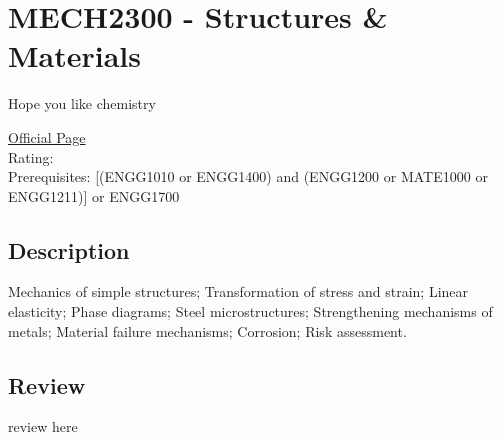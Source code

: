 \hypertarget{MECH2300}{\section{MECH2300 - Structures \& Materials}}
Hope you like chemistry

\large
\textcolor{turbo_purple}{\href{https://my.uq.edu.au/programs-courses/course.html?course_code=MECH2300}{Official Page}} \\
Rating: \cstar\cstar\cstar\cstar\ostar \\
Prerequisites: [(ENGG1010 or ENGG1400) and (ENGG1200 or MATE1000 or ENGG1211)] or ENGG1700

\normalsize
\subsection*{Description}
Mechanics of simple structures; Transformation of stress and strain; Linear elasticity; Phase diagrams; Steel microstructures; Strengthening mechanisms of metals; Material failure mechanisms; Corrosion; Risk assessment.

\subsection*{Review}
review here
